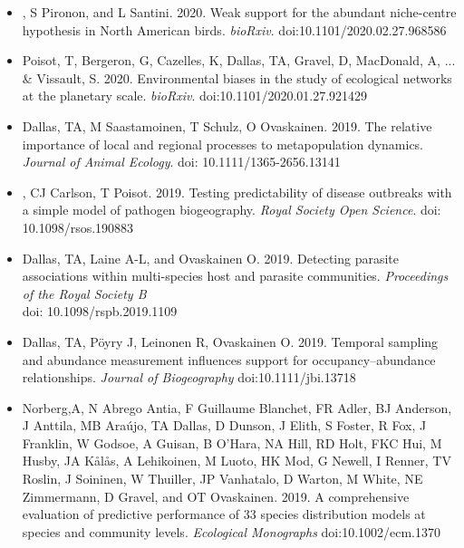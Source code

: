 \documentclass[]{CV}
\begin{document}
\begin{itemize}
\item {}, S Pironon, and L Santini. 2020. Weak support for the abundant niche-centre hypothesis in North American birds. \textit{bioRxiv}. doi:10.1101/2020.02.27.968586

\item \OA Poisot, T, Bergeron, G, Cazelles, K, {\mefont Dallas, TA}, Gravel, D, MacDonald, A, ... \& Vissault, S. 2020. Environmental biases in the study of ecological networks at the planetary scale. \textit{bioRxiv}. doi:10.1101/2020.01.27.921429

\end{itemize}





{}

\begin{itemize}

	\item {\mefont Dallas, TA},  M Saastamoinen, T Schulz, O Ovaskainen. 2019. The relative importance of local and regional processes to metapopulation dynamics. \textit{Journal of Animal Ecology}. doi: 10.1111/1365-2656.13141 

	\item {}, CJ Carlson, T Poisot. 2019. Testing predictability of disease outbreaks with a simple model of pathogen biogeography. \textit{Royal Society Open Science}. doi: 10.1098/rsos.190883

	\item {\mefont Dallas, TA}, Laine A-L, and Ovaskainen O. 2019. Detecting parasite associations within multi-species host and parasite communities. \textit{Proceedings of the Royal Society B} \\ doi: 10.1098/rspb.2019.1109

	\item {\mefont Dallas, TA}, P{\"o}yry J, Leinonen R, Ovaskainen O. 2019. Temporal sampling and abundance measurement influences support for occupancy–abundance relationships. \textit{Journal of Biogeography} doi:10.1111/jbi.13718​

  \item Norberg,A, N Abrego Antia, F Guillaume Blanchet, FR Adler, BJ Anderson, J Anttila, MB Araújo, {\mefont TA Dallas}, D Dunson, J Elith, S Foster, R Fox, J Franklin, W Godsoe, A Guisan, B O'Hara, NA Hill, RD Holt, FKC Hui, M Husby, JA Kålås, A Lehikoinen, M Luoto, HK Mod, G Newell, I Renner, TV Roslin, J Soininen, W Thuiller, JP Vanhatalo, D Warton, M White, NE Zimmermann, D Gravel, and OT Ovaskainen. 2019. A comprehensive evaluation of predictive performance of 33 species distribution models at species and community levels. \textit{Ecological Monographs} doi:10.1002/ecm.1370
    

\end{itemize}
\end{document}
